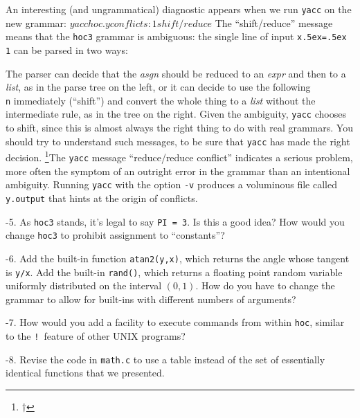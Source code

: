 {An interesting (and ungrammatical) diagnostic appears when
we run {\tt yacc} on the new grammar:
\begincode
$ yacc hoc.y
conflicts: 1 shift/reduce
$
\endcode
\noindent
The ``shift/reduce'' message means that the {\tt hoc3} grammar
is ambiguous: the single line of input {\tt x\kern.5ex=\kern.5ex 1}
can be parsed in two ways:
\medskip
\centerline{\hfil{}}
\medskip
\noindent
The parser can decide that the {\it asgn\/} should be reduced to
an {\it expr\/} and then to a {\it list}, as in the parse tree on
the left, or it can decide to use the following {\tt\\n} immediately
(``shift'') and convert the whole thing to a {\it list\/} without
the intermediate rule, as in the tree on the right. Given the
ambiguity, {\tt yacc} chooses to shift, since this is almost always
the right thing to do with real grammars. You should try to understand
such messages, to be sure that {\tt yacc} has made the right decision.%
\footnote{$\dag$}{\ninepoint The {\tt yacc} message ``reduce/reduce
conflict'' indicates a serious problem, more often the symptom of an
outright error in the grammar than an intentional ambiguity.}
Running {\tt yacc} with the option {\tt-v} produces a voluminous
file called {\tt y.output} that hints at the origin of conflicts.

-5.
As {\tt hoc3} stands, it's legal to say {\tt PI = 3}. Is this a good
idea? How would you change {\tt hoc3} to prohibit assignment to
``constants''?\endexercise

-6.
Add the built-in function {\tt atan2(y,x)}, which returns the angle
whose tangent is {\tt y/x}. Add the built-in {\tt rand()}, which
returns a floating point random variable uniformly distributed on
the interval $(0,1)$. How do you have to change the grammar to allow
for built-ins with different numbers of arguments?\endexercise

-7.
How would you add a facility to execute commands from within {\tt hoc},
similar to the {\tt!}~feature of other {\sc UNIX} programs?\endexercise

-8.
Revise the code in {\tt math.c} to use a table instead of the set
of essentially identical functions that we presented.\endexercise

}
